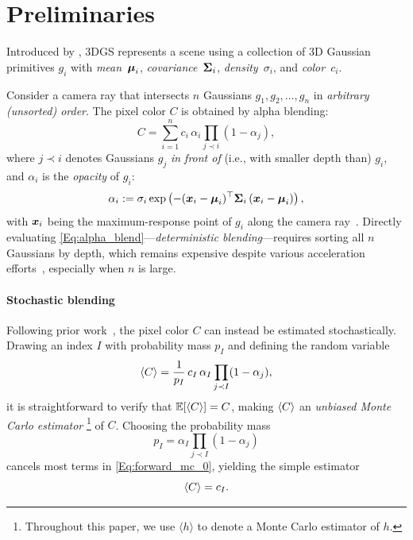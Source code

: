 \section{Preliminaries}
\label{sec:prelim}

Introduced by \citet{kerbl20233d}, 3DGS represents a scene using a collection of 3D Gaussian primitives $g_i$ with \emph{mean}~$\boldsymbol{\mu}_i$, \emph{covariance}~$\boldsymbol{\Sigma}_i$, \emph{density}~$\sigma_i$, and \emph{color}~$c_i$.

Consider a camera ray that intersects $n$ Gaussians $g_1, g_2, \ldots, g_n$ in \emph{arbitrary (unsorted) order}.
The pixel color $C$ is obtained by alpha blending:
%
\begin{equation}
	\label{Eq:alpha_blend}
	C = \sum_{i=1}^{n} c_i \,\alpha_i \prod_{j \prec i} (1 - \alpha_j),
\end{equation}
%
where $j \prec i$ denotes Gaussians $g_j$ \emph{in front of} (i.e., with smaller depth than) $g_i$, and $\alpha_i$ is the \emph{opacity} of $g_i$:
%
\begin{equation}
	\label{Eq:particle_opacity}
	\alpha_i := \sigma_i \exp\left(-(\boldsymbol{x}_i - \boldsymbol{\mu}_i)^{\top} \boldsymbol{\Sigma}_i \,(\boldsymbol{x}_i - \boldsymbol{\mu}_i) \right),
\end{equation}
%
with $\boldsymbol{x}_i$ being the maximum-response point of $g_i$ along the camera ray~\cite{loccoz20243dgrt}.
Directly evaluating \autoref{Eq:alpha_blend}---\emph{deterministic blending}---requires sorting all $n$ Gaussians by depth, which remains expensive despite various acceleration efforts~\cite{HansonSpeedy, Fang2024MiniSplattingRS, chen2025hac100xcompression3d}, especially when $n$ is large.

\paragraph{Stochastic blending}
Following prior work~\cite{Enderton2010, Sun2025}, the pixel color $C$ can instead be estimated stochastically.
Drawing an index $I$ with probability mass $p_I$ and defining the random variable
%
\begin{equation}
	\label{Eq:forward_mc_0}
	\langle C \rangle = \frac{1}{p_I} \,c_I \,\alpha_I \prod_{j \prec I}(1 - \alpha_j),
\end{equation}
%
it is straightforward to verify that $\mathbb{E}[\langle C \rangle] = C$, making $\langle C \rangle$ an \emph{unbiased Monte Carlo estimator}%
\footnote{Throughout this paper, we use $\langle h \rangle$ to denote a Monte Carlo estimator of $h$.}
of $C$.
Choosing the probability mass
%
\begin{equation}
	\label{Eq:mc_pdf}
	p_I = \alpha_I \prod_{j \prec I}(1 - \alpha_j)
\end{equation}
%
cancels most terms in \autoref{Eq:forward_mc_0}, yielding the simple estimator
%
\begin{equation}
	\label{Eq:forward_mc}
	\langle C \rangle = c_I.
\end{equation}

